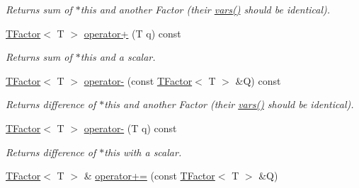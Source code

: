 \begin{CompactItemize}
\begin{CompactList}\small\item\em Returns sum of $\ast$this and another Factor (their \hyperlink{classdai_1_1TFactor_54c575d53b8c8a6a03c26c8cdc600ce4}{vars()} should be identical). \item\end{CompactList}\item 
\hypertarget{classdai_1_1TFactor_3c2f95c6fddf19bd871a89f419991c08}{
\hyperlink{classdai_1_1TFactor}{TFactor}$<$ T $>$ \hyperlink{classdai_1_1TFactor_3c2f95c6fddf19bd871a89f419991c08}{operator+} (T q) const }
\label{classdai_1_1TFactor_3c2f95c6fddf19bd871a89f419991c08}

\begin{CompactList}\small\item\em Returns sum of $\ast$this and a scalar. \item\end{CompactList}\item 
\hypertarget{classdai_1_1TFactor_36cd699efe9bcce52fb21d6a3eb7024a}{
\hyperlink{classdai_1_1TFactor}{TFactor}$<$ T $>$ \hyperlink{classdai_1_1TFactor_36cd699efe9bcce52fb21d6a3eb7024a}{operator-} (const \hyperlink{classdai_1_1TFactor}{TFactor}$<$ T $>$ \&Q) const }
\label{classdai_1_1TFactor_36cd699efe9bcce52fb21d6a3eb7024a}

\begin{CompactList}\small\item\em Returns difference of $\ast$this and another Factor (their \hyperlink{classdai_1_1TFactor_54c575d53b8c8a6a03c26c8cdc600ce4}{vars()} should be identical). \item\end{CompactList}\item 
\hypertarget{classdai_1_1TFactor_171e3bab13b2cd054e8ce1eb97be1112}{
\hyperlink{classdai_1_1TFactor}{TFactor}$<$ T $>$ \hyperlink{classdai_1_1TFactor_171e3bab13b2cd054e8ce1eb97be1112}{operator-} (T q) const }
\label{classdai_1_1TFactor_171e3bab13b2cd054e8ce1eb97be1112}

\begin{CompactList}\small\item\em Returns difference of $\ast$this with a scalar. \item\end{CompactList}\item 
\hypertarget{classdai_1_1TFactor_098a7c22159f23dead9e16ad3dff1e90}{
\hyperlink{classdai_1_1TFactor}{TFactor}$<$ T $>$ \& \hyperlink{classdai_1_1TFactor_098a7c22159f23dead9e16ad3dff1e90}{operator+=} (const \hyperlink{classdai_1_1TFactor}{TFactor}$<$ T $>$ \&Q)}
\label{classdai_1_1TFactor_098a7c22159f23dead9e16ad3dff1e90}


\end{CompactItemize}
